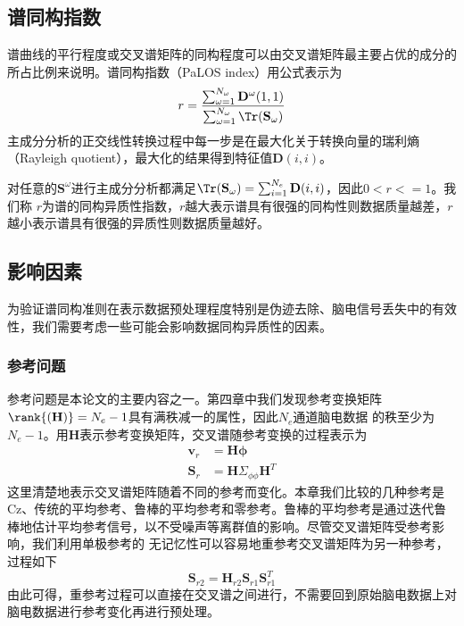 \subsection{谱同构指数}
谱曲线的平行程度或交叉谱矩阵的同构程度可以由交叉谱矩阵最主要占优的成分的所占比例来说明。谱同构指数（PaLOS index）用公式表示为
\begin{equation}\label{eq5.5}
r=\frac{\sum_{\omega=1}^{N_\omega}\mathbf{D}^\omega(1,1)}{\sum_{\omega=1}^{N_\omega}\Tr(\mathbf{S}_\omega)}
\end{equation}
主成分分析的正交线性转换过程中每一步是在最大化关于转换向量的瑞利熵（Rayleigh quotient），最大化的结果得到特征值$\mathbf{D}(i,i)$。

对任意的$\mathbf{S}^\omega$进行主成分分析都满足$\Tr(\mathbf{S}_\omega)=\sum_{i=1}^{N_e}\mathbf{D}(i,i)$，因此$0<r<=1$。我们称
$r$为谱的同构异质性指数，$r$越大表示谱具有很强的同构性则数据质量越差，$r$越小表示谱具有很强的异质性则数据质量越好。

\subsection{影响因素}
为验证谱同构准则在表示数据预处理程度特别是伪迹去除、脑电信号丢失中的有效性，我们需要考虑一些可能会影响数据同构异质性的因素。
\subsubsection{参考问题}
参考问题是本论文的主要内容之一。第四章中我们发现参考变换矩阵$\rank{(\mathbf{H})}=N_e-1$具有满秩减一的属性，因此$N_e$通道脑电数据
的秩至少为$N_e-1$。用$\mathbf{H}$表示参考变换矩阵，交叉谱随参考变换的过程表示为
\begin{equation}\label{eq5.6}
\begin{aligned}
\mathbf{v}_r& =\mathbf{H\phi}\\
\mathbf{S}_r& =\mathbf{H}\Sigma_{\phi\phi}\mathbf{H}^T
\end{aligned}
\end{equation}
这里清楚地表示交叉谱矩阵随着不同的参考而变化。本章我们比较的几种参考是Cz、传统的平均参考、鲁棒的平均参考和零参考。鲁棒的平均参考是通过迭代鲁棒地估计平均参考信号，以不受噪声等离群值的影响。尽管交叉谱矩阵受参考影响，我们利用单极参考的
无记忆性可以容易地重参考交叉谱矩阵为另一种参考，过程如下
\begin{equation}\label{eq5.7}
\mathbf{S}_{r2}=\mathbf{H}_{r2}\mathbf{S}_{r1}\mathbf{S}_{r1}^T
\end{equation}
由此可得，重参考过程可以直接在交叉谱之间进行，不需要回到原始脑电数据上对脑电数据进行参考变化再进行预处理。

